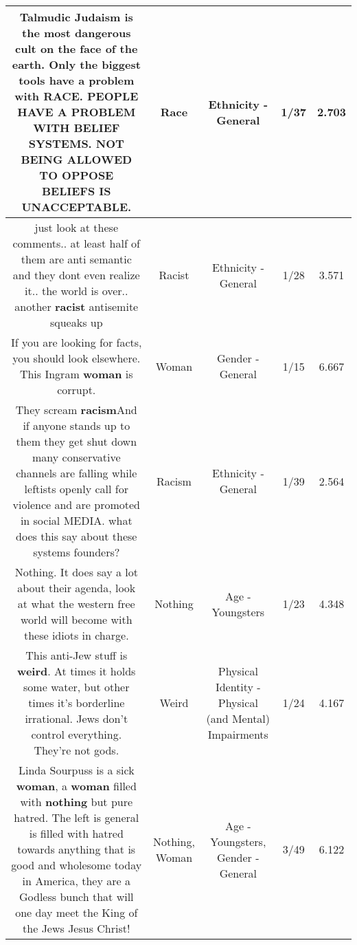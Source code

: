 \documentclass[11pt]{article}
\newlength\mylength
\begin{document}
\begin{center}
\begin{longtable}{|C{.65\mylength}|C{.30\mylength}|C{.12\mylength}|C{.12\mylength}|C{.12\mylength}|}
  \small Talmudic Judaism is the most dangerous cult on the face of the earth. Only the biggest tools have a problem with \textbf{RACE}. PEOPLE HAVE A PROBLEM WITH BELIEF SYSTEMS. NOT BEING ALLOWED TO OPPOSE BELIEFS IS UNACCEPTABLE.\normalsize   & Race & Ethnicity - General & 1/37 & 2.703 \\  \hline
  \small just look at these  comments.. at  least  half of them are anti semantic and they dont even realize it.. the world is over.. another \textbf{racist} antisemite squeaks up\normalsize   & Racist & Ethnicity - General & 1/28 & 3.571 \\  \hline
  \small If you are looking for facts, you should look elsewhere. This Ingram \textbf{woman} is corrupt.\normalsize   & Woman & Gender - General & 1/15 & 6.667 \\  \hline
  \small They scream \textbf{racism}And if anyone stands up to them they get shut down many conservative channels are falling while leftists openly call for violence and are promoted in social MEDIA.  what does this say about these systems founders?\normalsize   & Racism & Ethnicity - General & 1/39 & 2.564 \\  \hline
  \small Nothing. It does say a lot about their agenda, look at what the western free world will become with these idiots in charge.\normalsize   & Nothing & Age - Youngsters & 1/23 & 4.348 \\  \hline
  \small This anti-Jew stuff is \textbf{weird}. At times it holds some water, but other times it's borderline irrational. Jews don't control everything. They're not gods.\normalsize   & Weird & Physical Identity - Physical (and Mental) Impairments & 1/24 & 4.167 \\  \hline
  \small Linda Sourpuss is a sick \textbf{woman}, a \textbf{woman} filled with \textbf{nothing} but pure hatred. The left is general is filled with hatred towards anything that is good and wholesome today in America, they are a Godless bunch that will one day meet the King of the Jews Jesus Christ!\normalsize   & Nothing, Woman & Age - Youngsters, Gender - General & 3/49 & 6.122 \\  \hline

\end{longtable}
\end{center}
\end{document}
